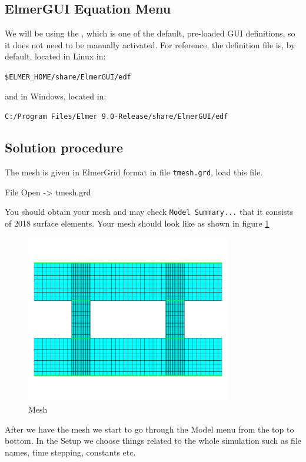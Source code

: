\subsection*{ElmerGUI Equation Menu}

We will be using the , which is one of the default, pre-loaded GUI definitions, so it does not need to be manually activated.  For reference, the  \texttt{} definition file is, by default, located in Linux in:

\texttt{\$ELMER\_HOME/share/ElmerGUI/edf}

\noindent and in Windows, located in:

\texttt{C:/Program Files/Elmer 9.0-Release/share/ElmerGUI/edf}\\


\subsection*{Solution procedure}

The mesh is given in ElmerGrid format in file \texttt{tmesh.grd}, load this file.

\ttbegin
File 
  Open -> tmesh.grd
\ttend

You should obtain your mesh and may check \texttt{Model Summary...} that it consists of 2018 surface elements.  Your mesh should look like as shown in figure \ref{fg:mesh}

\begin{figure}[H]
\centering
\includegraphics[width=0.8\textwidth]{mesh}
\caption{Mesh}\label{fg:mesh}
\end{figure}

After we have the mesh we start to go through the Model menu from the top to bottom.  In the Setup we choose things related to the whole simulation such as file names, time stepping, constants etc.  

